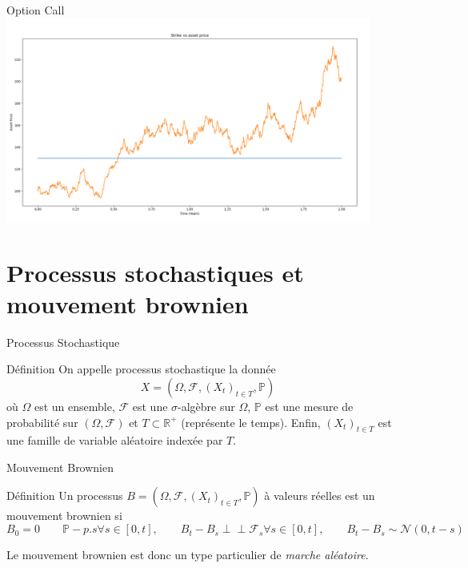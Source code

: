 \documentclass{beamer}
\newcommand{\1}{\mathmybb{1}}
\newcommand{\indep}{\perp \!\!\! \perp}
\begin{document}
\begin{frame}{Option Call}
  \includegraphics[width=12cm]{imgs/strike.png}
\end{frame}
\section{Processus stochastiques et mouvement brownien}
\begin{frame}{Processus Stochastique}
  \begin{block}{Définition}
    On appelle processus stochastique la donnée
    \begin{equation}
      X = (\varOmega, \mathcal{F}, \left(  X_{t} \right)_{t\in T}, \mathbb{P})
    \end{equation}
    où $ \varOmega $ est un ensemble, $ \mathcal{F} $ est une $\sigma$-algèbre sur $ \varOmega $, $\mathbb{P}$ est une mesure de probabilité sur $ \left( \varOmega , \mathcal{F} \right)$ et $T \subset \mathbb{R}^{+}$ (représente le temps).
    Enfin, $\left( X_{t} \right)_{t\in T} $  est une famille de variable aléatoire indexée par $ T $.
  \end{block}
\end{frame}
\begin{frame}{Mouvement Brownien}
  \begin{block}{Définition}
    Un processus $ B = (\varOmega, \mathcal{F}, \left(  X_{t} \right)_{t\in T}, \mathbb{P} ) $ à valeurs réelles est un mouvement brownien si
    \begin{subequations}
      \begin{equation} B_{0} = 0 \qquad \mathbb{P}-p.s \end{equation}
      \begin{equation} \forall s \in \left[0, t\right], \qquad B_{t} - B_{s} \indep \mathcal{F}_{s} \end{equation}
      \begin{equation} \forall s \in \left[0, t\right], \qquad B_{t} - B_{s} \sim \mathcal{N} \left( 0, t-s\right)\end{equation}
      \end{subequations}
    \end{block}
    Le mouvement brownien est donc un type particulier de {\em marche aléatoire}.
\end{frame}
\end{document}
